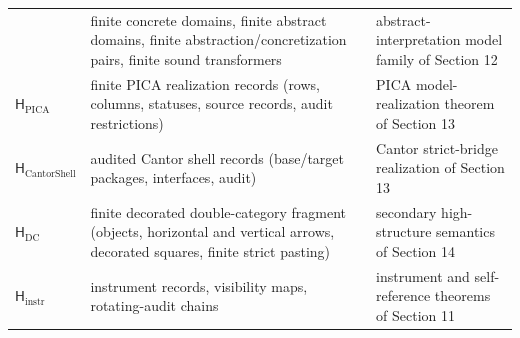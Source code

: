 \documentclass[11pt]{article}
\theoremstyle{definition}
\begin{document}
\begin{longtable}[]{@{}lll@{}}
\begin{minipage}[t]{0.30\columnwidth}
\end{minipage} & \begin{minipage}[t]{0.30\columnwidth}\raggedright
finite concrete domains, finite abstract domains, finite abstraction/concretization pairs, finite sound transformers\strut
\end{minipage} & \begin{minipage}[t]{0.30\columnwidth}\raggedright
abstract-interpretation model family of Section 12\strut
\end{minipage}\tabularnewline
\begin{minipage}[t]{0.30\columnwidth}\raggedright
\(\mathsf H_{\mathrm{PICA}}\)\strut
\end{minipage} & \begin{minipage}[t]{0.30\columnwidth}\raggedright
finite PICA realization records (rows, columns, statuses, source records, audit restrictions)\strut
\end{minipage} & \begin{minipage}[t]{0.30\columnwidth}\raggedright
PICA model-realization theorem of Section 13\strut
\end{minipage}\tabularnewline
\begin{minipage}[t]{0.30\columnwidth}\raggedright
\(\mathsf H_{\mathrm{CantorShell}}\)\strut
\end{minipage} & \begin{minipage}[t]{0.30\columnwidth}\raggedright
audited Cantor shell records (base/target packages, interfaces, audit)\strut
\end{minipage} & \begin{minipage}[t]{0.30\columnwidth}\raggedright
Cantor strict-bridge realization of Section 13\strut
\end{minipage}\tabularnewline
\begin{minipage}[t]{0.30\columnwidth}\raggedright
\(\mathsf H_{\mathrm{DC}}\)\strut
\end{minipage} & \begin{minipage}[t]{0.30\columnwidth}\raggedright
finite decorated double-category fragment (objects, horizontal and vertical arrows, decorated squares, finite strict pasting)\strut
\end{minipage} & \begin{minipage}[t]{0.30\columnwidth}\raggedright
secondary high-structure semantics of Section 14\strut
\end{minipage}\tabularnewline
\begin{minipage}[t]{0.30\columnwidth}\raggedright
\(\mathsf H_{\mathrm{instr}}\)\strut
\end{minipage} & \begin{minipage}[t]{0.30\columnwidth}\raggedright
instrument records, visibility maps, rotating-audit chains\strut
\end{minipage} & \begin{minipage}[t]{0.30\columnwidth}\raggedright
instrument and self-reference theorems of Section 11\strut
\end{minipage}\tabularnewline
\bottomrule
\end{longtable}
\end{document}
